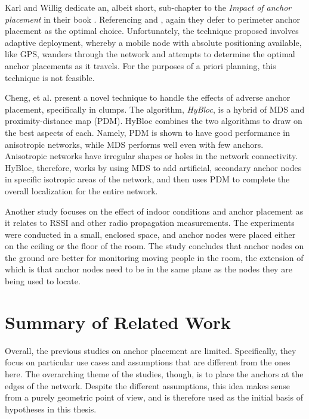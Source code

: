 Karl and Willig dedicate an, albeit short, sub-chapter to the \emph{Impact of anchor placement} in their book \cite[p.247-248]{Karl}.  Referencing \cite{Doherty} and \cite{Savarese}, again they defer to perimeter anchor placement as the optimal choice.  Unfortunately, the technique proposed involves adaptive deployment, whereby a mobile node with absolute positioning available, like GPS, wanders through the network and attempts to determine the optimal anchor placements as it travels.  For the purposes of a priori planning, this technique is not feasible.

Cheng, et al.\cite{Cheng} present a novel technique to handle the effects of adverse anchor placement, specifically in clumps.  The algorithm, \emph{HyBloc}, is a hybrid of MDS and proximity-distance map (PDM)\cite{PDM}.  HyBloc combines the two algorithms to draw on the best aspects of each. Namely, PDM is shown to have good performance in anisotropic networks, while MDS performs well even with few anchors. Anisotropic networks have irregular shapes or holes in the network connectivity. HyBloc, therefore, works by using MDS to add artificial, secondary anchor nodes in specific isotropic areas of the network, and then uses PDM to complete the overall localization for the entire network.

Another study focuses on the effect of indoor conditions and anchor placement as it relates to RSSI and other radio propagation measurements\cite{Zemek}.  The experiments were conducted in a small, enclosed space, and anchor nodes were placed either on the ceiling or the floor of the room.  The study concludes that anchor nodes on the ground are better for monitoring moving people in the room, the extension of which is that anchor nodes need to be in the same plane as the nodes they are being used to locate.

\section{Summary of Related Work}

Overall, the previous studies on anchor placement are limited.  Specifically, they focus on particular use cases and assumptions that are different from the ones here. The overarching theme of the studies, though, is to place the anchors at the edges of the network.  Despite the different assumptions, this idea makes sense from a purely geometric point of view, and is therefore used as the initial basis of hypotheses in this thesis.

